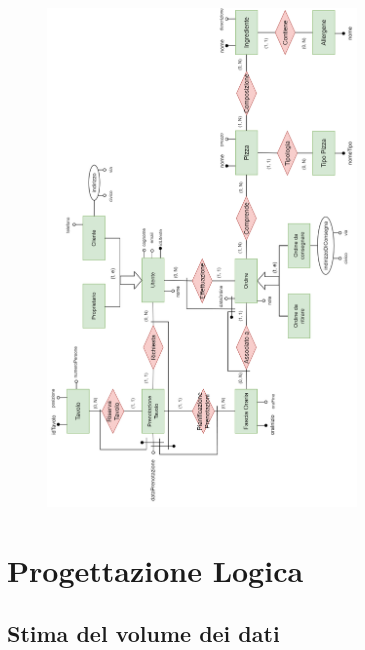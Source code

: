 \documentclass[a4paper,12pt, oneside]{article}
\begin{document}
\begin{figure}[ht]
    \centering
    \includegraphics[width=0.73\textwidth]{images/diagramma_tutto1.png}
    \label{fig:diagramma_tutto1}
\end{figure}

\newpage
\section{Progettazione Logica}
\subsection{Stima del volume dei dati}
\end{document}
